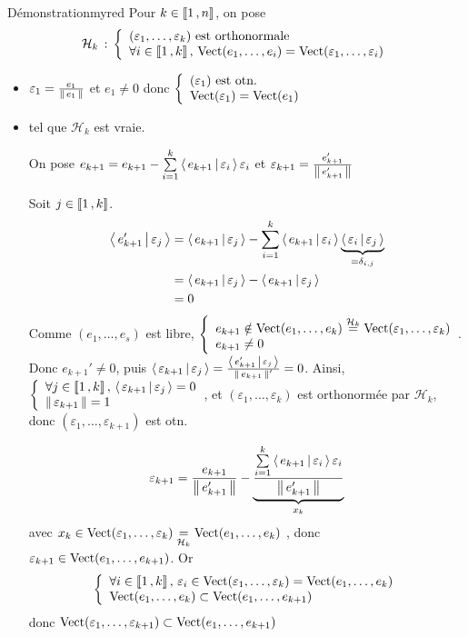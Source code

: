         \begin{demo}{Démonstration}{myred}
            Pour $k \in \left\llbracket 1 \, , n \right\rrbracket$, on pose 
            \[ \mathcal{H}_k \,: \, \et{(\varepsilon_1,\ldots,\varepsilon_k) \text{ est orthonormale}}{\forall i \in \intervalleEntier{1}{k}, \, \Vect(e_1,\ldots,e_i) = \Vect(\varepsilon_1,\ldots,\varepsilon_i)} \]
            \begin{itemize}
                \item {} \quad  $\varepsilon_1 = \frac{e_1}{\left\lVert\,e_1\,\right\rVert}$ et $e_1 \neq 0$ donc $\et{(\varepsilon_1) \text{ est otn.}}{\Vect(\varepsilon_1) = \Vect(e_1)}$
                \item {} tel que $\mathcal{H}_k$ est vraie. 
                
                On pose $e_{k+1} = e_{k+1} - \sum\limits_{i=1}^{k} \left<\,e_{k+1}\,\middle|\,\varepsilon_i\,\right>\varepsilon_i$ et $\varepsilon_{k+1} = \frac{e_{k+1}'}{\left\lVert\,e_{k+1}'\,\right\rVert}$
                
                Soit $j \in \left\llbracket 1 \, , k \right\rrbracket$.
                \begin{align*}
                    \left<\,e_{k+1}'\,\middle|\,\varepsilon_j\,\right> &= \left<\,e_{k+1}\,\middle|\,\varepsilon_j\,\right> - \sum\limits_{i=1}^{k} \left<\,e_{k+1}\,\middle|\,\varepsilon_i\,\right>\underbrace{\left<\,\varepsilon_i\,\middle|\,\varepsilon_j\,\right>}_{= \delta_{i,j}} \\
                    &= \left<\,e_{k+1}\,\middle|\,\varepsilon_j\,\right> - \left<\,e_{k+1}\,\middle|\,\varepsilon_j\,\right> \\
                    &= 0
                \end{align*} 
                Comme $(e_1,\ldots,e_s)$ est libre, $\et{e_{k+1} \notin \Vect(e_1,\ldots,e_k) \overset{\mathcal{H}_k}{=} \Vect(\varepsilon_1, \ldots, \varepsilon_k)}{e_{k+1} \neq 0} $. Donc $e_{k+1}' \neq 0$, puis $\left<\,\varepsilon_{k+1}\,\middle|\,\varepsilon_j\,\right> = \frac{\left<\,e_{k+1}'\,\middle|\,\varepsilon_j\,\right>}{\left\lVert\,e_{k+1}\,\right\rVert'} = 0$. Ainsi, $\et{\forall j \in \intervalleEntier{1}{k}, \, \spr{\varepsilon_{k+1}}{\varepsilon_j} = 0}{\norm{\varepsilon_{k+1}} = 1}$, et $(\varepsilon_1, \ldots, \varepsilon_k)$ est orthonormée par $\mathcal{H}_k$, donc $(\varepsilon_1, \ldots, \varepsilon_{k+1})$ est otn.
                
                \[ \varepsilon_{k+1} = \frac{e_{k+1}}{\left\lVert\,e_{k+1}'\,\right\rVert} - \underbrace{\frac{\sum\limits_{i=1}^k \left<\,e_{k+1}\,\middle|\,\varepsilon_i\,\right>\varepsilon_i}{\left\lVert\,e_{k+1}'\,\right\rVert}}_{x_k} \]
                avec $x_k \in \operatorname{Vect}(\varepsilon_1,\ldots,\varepsilon_k) \underset{\mathcal{H}_k}{=} \operatorname{Vect}(e_1,\ldots,e_k)$ , donc $\varepsilon_{k+1} \in \operatorname{Vect}(e_1,\ldots,e_{k+1})$. Or 
                \[ \et{\forall i \in \intervalleEntier{1}{k}, \, \varepsilon_i \in \Vect(\varepsilon_1, \ldots, \varepsilon_k) = \Vect(e_1,\ldots,e_k)}{\Vect(e_1,\ldots,e_k) \subset \Vect(e_1, \ldots, e_{k+1})} \] 
                donc $\operatorname{Vect}(\varepsilon_1,\ldots,\varepsilon_{k+1}) \subset \operatorname{Vect}(e_1,\ldots,e_{k+1})$
                

\end{itemize}
\end{demo}
